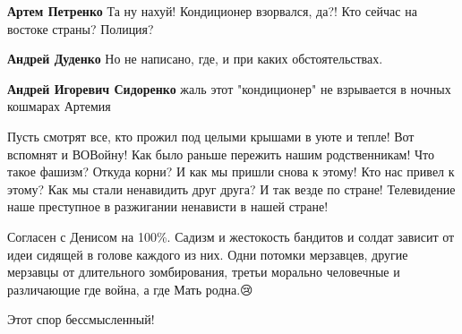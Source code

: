 \begin{itemize}
\begin{itemize}
\textbf{Артем Петренко} Та ну нахуй! Кондиционер взорвался, да?!
Кто сейчас на востоке страны? Полиция?

 
\textbf{Андрей Дуденко} Но не написано, где, и при каких обстоятельствах. \Smiley[1.0][yellow]

 
\textbf{Андрей Игоревич Сидоренко} жаль этот "кондиционер" не взрывается в ночных кошмарах Артемия

\end{itemize}

\par
 

Пусть смотрят все, кто прожил под целыми крышами в уюте и тепле! Вот вспомнят и
ВОВойну! Как было раньше пережить нашим родственникам! Что такое фашизм? Откуда
корни? И как мы пришли снова к этому! Кто нас привел к этому? Как мы стали
ненавидить друг друга? И так везде по стране! Телевидение наше преступное в
разжигании ненависти в нашей стране!


Согласен с Денисом на 100\%. Садизм и жестокость бандитов и солдат зависит от
идеи сидящей в голове каждого из них. Одни потомки мерзавцев, другие мерзавцы
от длительного зомбирования, третьи морально человечные и различающие где
война, а где Мать родна.😢


Этот спор бессмысленный!


\end{itemize}

